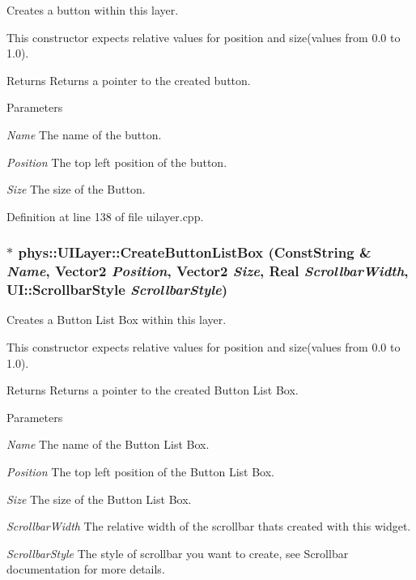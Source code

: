Creates a button within this layer. 

This constructor expects relative values for position and size(values from 0.0 to 1.0). \begin{DoxyReturn}{Returns}
Returns a pointer to the created button. 
\end{DoxyReturn}

\begin{DoxyParams}{Parameters}
\item[{\em Name}]The name of the button. \item[{\em Position}]The top left position of the button. \item[{\em Size}]The size of the Button. \end{DoxyParams}


Definition at line 138 of file uilayer.cpp.

\hypertarget{classphys_1_1UILayer_aa5634ff2ed12c4168dc3c49ac601b933}{
\subsubsection[{CreateButtonListBox}]{ $\ast$ phys::UILayer::CreateButtonListBox ({\bf ConstString} \& {\em Name}, \/  {\bf Vector2} {\em Position}, \/  {\bf Vector2} {\em Size}, \/  {\bf Real} {\em ScrollbarWidth}, \/  UI::ScrollbarStyle {\em ScrollbarStyle})}}
\label{da/d48/classphys_1_1UILayer_aa5634ff2ed12c4168dc3c49ac601b933}


Creates a Button List Box within this layer. 

This constructor expects relative values for position and size(values from 0.0 to 1.0). \begin{DoxyReturn}{Returns}
Returns a pointer to the created Button List Box. 
\end{DoxyReturn}

\begin{DoxyParams}{Parameters}
\item[{\em Name}]The name of the Button List Box. \item[{\em Position}]The top left position of the Button List Box. \item[{\em Size}]The size of the Button List Box. \item[{\em ScrollbarWidth}]The relative width of the scrollbar thats created with this widget. \item[{\em ScrollbarStyle}]The style of scrollbar you want to create, see Scrollbar documentation for more details. \end{DoxyParams}


